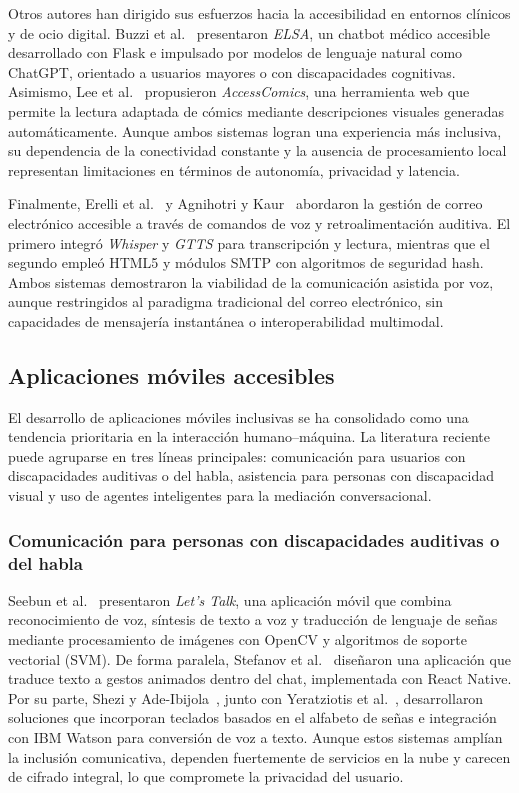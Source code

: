 \documentclass[lettersize,journal]{IEEEtran}
\begin{document}
            Otros autores han dirigido sus esfuerzos hacia la accesibilidad en entornos clínicos y de ocio digital. Buzzi et al.~\cite{Buzzi2024} presentaron \textit{ELSA}, un chatbot médico accesible desarrollado con Flask e impulsado por modelos de lenguaje natural como ChatGPT, orientado a usuarios mayores o con discapacidades cognitivas. Asimismo, Lee et al.~\cite{Lee2021} propusieron \textit{AccessComics}, una herramienta web que permite la lectura adaptada de cómics mediante descripciones visuales generadas automáticamente. Aunque ambos sistemas logran una experiencia más inclusiva, su dependencia de la conectividad constante y la ausencia de procesamiento local representan limitaciones en términos de autonomía, privacidad y latencia.
            
            Finalmente, Erelli et al.~\cite{Erelli2024} y Agnihotri y Kaur~\cite{Agnihotri2023} abordaron la gestión de correo electrónico accesible a través de comandos de voz y retroalimentación auditiva. El primero integró \textit{Whisper} y \textit{GTTS} para transcripción y lectura, mientras que el segundo empleó HTML5 y módulos SMTP con algoritmos de seguridad hash. Ambos sistemas demostraron la viabilidad de la comunicación asistida por voz, aunque restringidos al paradigma tradicional del correo electrónico, sin capacidades de mensajería instantánea o interoperabilidad multimodal.
        
        \subsection{Aplicaciones móviles accesibles}
            El desarrollo de aplicaciones móviles inclusivas se ha consolidado como una tendencia prioritaria en la interacción humano–máquina. La literatura reciente puede agruparse en tres líneas principales: comunicación para usuarios con discapacidades auditivas o del habla, asistencia para personas con discapacidad visual y uso de agentes inteligentes para la mediación conversacional.
        
            \subsubsection{Comunicación para personas con discapacidades auditivas o del habla}
                Seebun et al.~\cite{Seebun2020} presentaron \textit{Let’s Talk}, una aplicación móvil que combina reconocimiento de voz, síntesis de texto a voz y traducción de lenguaje de señas mediante procesamiento de imágenes con OpenCV y algoritmos de soporte vectorial (SVM). De forma paralela, Stefanov et al.~\cite{Stefanov2024} diseñaron una aplicación que traduce texto a gestos animados dentro del chat, implementada con React Native. Por su parte, Shezi y Ade-Ibijola~\cite{Shezi2020}, junto con Yeratziotis et al.~\cite{Yeratziotis2023}, desarrollaron soluciones que incorporan teclados basados en el alfabeto de señas e integración con IBM Watson para conversión de voz a texto. Aunque estos sistemas amplían la inclusión comunicativa, dependen fuertemente de servicios en la nube y carecen de cifrado integral, lo que compromete la privacidad del usuario.
            
\end{document}
